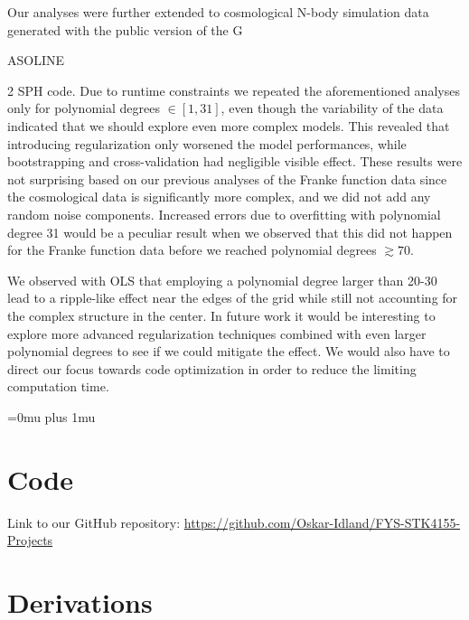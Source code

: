 \documentclass[aps,pra,english,notitlepage,reprint,nofootinbib]{revtex4-1}  %
\begin{document}
Our analyses were further extended to cosmological N-body simulation data generated with the public version of the G\begin{scriptsize}ASOLINE\end{scriptsize}2 SPH code. Due to runtime constraints we repeated the aforementioned analyses only for polynomial degrees $\in[1,31]$, even though the variability of the data indicated that we should explore even more complex models. This revealed that introducing regularization only worsened the model performances, while bootstrapping and cross-validation had negligible visible effect. These results were not surprising based on our previous analyses of the Franke function data since the cosmological data is significantly more complex, and we did not add any random noise components. Increased errors due to overfitting with polynomial degree 31 would be a peculiar result when we observed that this did not happen for the Franke function data before we reached polynomial degrees $\gtrsim70$. 

We observed with OLS that employing a polynomial degree larger than 20-30 lead to a ripple-like effect near the edges of the grid while still not accounting for the complex structure in the center. In future work it would be interesting to explore more advanced regularization techniques combined with even larger polynomial degrees to see if we could mitigate the effect. We would also have to direct our focus towards code optimization in order to reduce the limiting computation time.


\Urlmuskip=0mu plus 1mu\relax
\onecolumngrid


\newpage
\appendix
\section{Code}\label{appsec:code}
Link to our GitHub repository: \href{https://github.com/Oskar-Idland/FYS-STK4155-Projects}{https://github.com/Oskar-Idland/FYS-STK4155-Projects}

\section{Derivations}\label{appsec:derivations}
\end{document}
